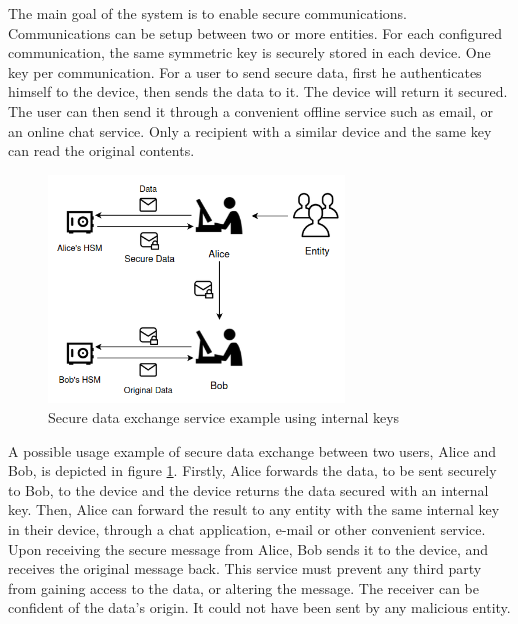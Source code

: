 The main goal of the system is to enable secure communications. Communications can be setup between two or more entities. For each configured communication, the same symmetric key is securely stored in each device. One key per communication.
For a user to send secure data, first he authenticates himself to the device, then sends the data to it. The device will return it secured. The user can then send it through a convenient offline service such as email, or an online chat service. Only a recipient with a similar device and the same key can read the original contents.

\begin{figure}[h!]
    \centering
    \includegraphics[width=0.7\textwidth]{./Images/user-data-service.png}
    \caption{Secure data exchange service example using internal keys}
    \label{fig:user:data-service}
\end{figure}

A possible usage example of secure data exchange between two users, Alice and Bob, is depicted in figure \ref{fig:user:data-service}. Firstly, Alice forwards the data, to be sent securely to Bob, to the device and the device returns the data secured with an internal key. Then, Alice can forward the result to any entity with the same internal key in their device, through a chat application, e-mail or other convenient service.
Upon receiving the secure message from Alice, Bob sends it to the device, and receives the original message back.
This service must prevent any third party from gaining access to the data, or altering the message. The receiver can be confident of the data's origin. It could not have been sent by any malicious entity.

